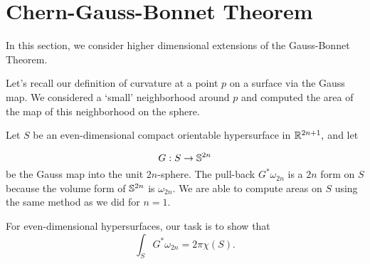 \section{Chern-Gauss-Bonnet Theorem}
\label{sec:chern-gauss-bonnet}

In this section, we consider higher dimensional extensions of the
Gauss-Bonnet Theorem. 

Let's recall our definition of curvature at a point $p$ on a surface via the Gauss map.
We considered a `small' neighborhood around $p$ and computed
the area of the map of this neighborhood on the sphere. 

Let $S$ be an even-dimensional compact orientable hypersurface in 
$\mathbb{R}^{2n+1},$ and let

$$G:S\rightarrow \mathbb{S}^{2n}$$
be the Gauss map into the unit $2n$-sphere.
The pull-back $G^*\omega_{2n}$ is a $2n$ form on $S$ because
 the volume form  of $\mathbb{S}^{2n}$ is $\omega_{2n}.$
 We are able to compute areas on $S$ using the same method as we did 
for $n=1.$

For even-dimensional hypersurfaces, our task is to show that 
$$\int_SG^*\omega_{2n}=2\pi \chi(S).$$




